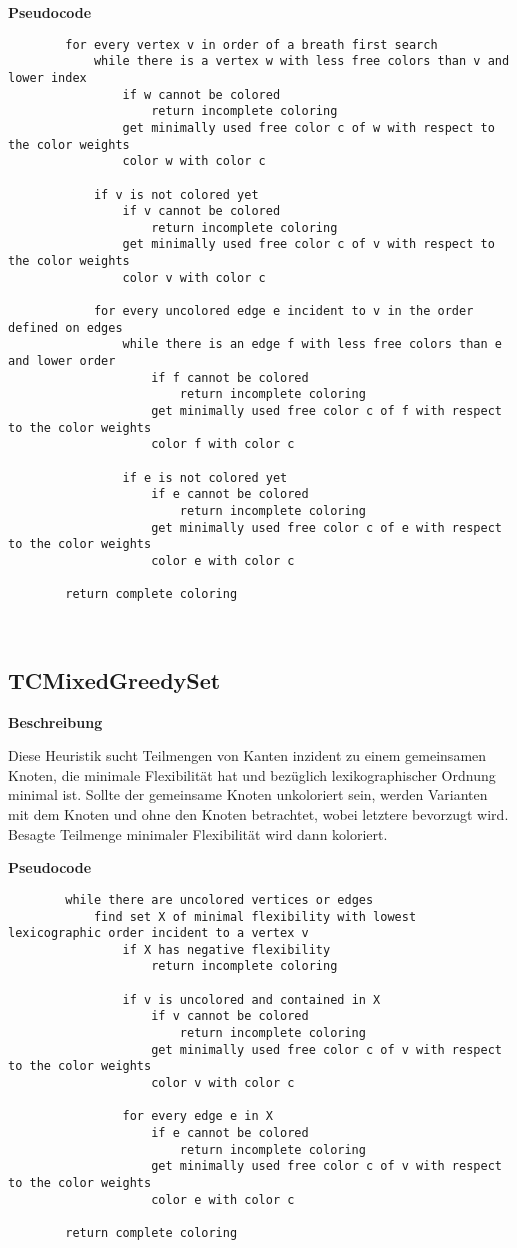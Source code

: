 \documentclass{article}
\begin{document}
	\textbf{Pseudocode}
	\begin{verbatim}
		for every vertex v in order of a breath first search
		    while there is a vertex w with less free colors than v and lower index
		        if w cannot be colored
		            return incomplete coloring
		        get minimally used free color c of w with respect to the color weights
		        color w with color c
		    
		    if v is not colored yet
		        if v cannot be colored
		            return incomplete coloring
		        get minimally used free color c of v with respect to the color weights
		        color v with color c
		    
		    for every uncolored edge e incident to v in the order defined on edges
		        while there is an edge f with less free colors than e and lower order
		            if f cannot be colored
		                return incomplete coloring
		            get minimally used free color c of f with respect to the color weights
		            color f with color c
		           
		        if e is not colored yet    
		            if e cannot be colored
		                return incomplete coloring
		            get minimally used free color c of e with respect to the color weights
		            color e with color c
		    
		return complete coloring
	\end{verbatim}
	
	~\newpage
	\subsection{TCMixedGreedySet}
	
	\textbf{Beschreibung}
	
	Diese Heuristik sucht Teilmengen von Kanten inzident zu einem gemeinsamen Knoten, die minimale Flexibilität hat und bezüglich lexikographischer Ordnung minimal ist. Sollte der gemeinsame Knoten unkoloriert sein, werden Varianten mit dem Knoten und ohne den Knoten betrachtet, wobei letztere bevorzugt wird. Besagte Teilmenge minimaler Flexibilität wird dann koloriert.
	
	\textbf{Pseudocode}
	\begin{verbatim}
		while there are uncolored vertices or edges
		    find set X of minimal flexibility with lowest lexicographic order incident to a vertex v
		        if X has negative flexibility
		            return incomplete coloring
		            
		        if v is uncolored and contained in X
		            if v cannot be colored
		                return incomplete coloring
		            get minimally used free color c of v with respect to the color weights
		            color v with color c
		        
		        for every edge e in X
		            if e cannot be colored
		                return incomplete coloring
		            get minimally used free color c of v with respect to the color weights
		            color e with color c
		
		return complete coloring
	\end{verbatim}
	
\end{document}

